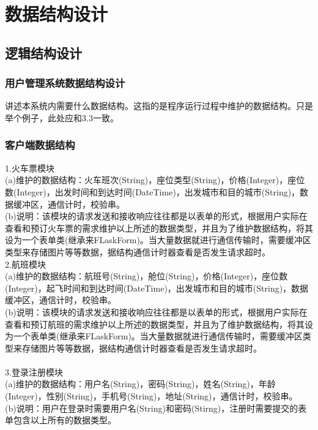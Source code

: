 \chapter{数据结构设计}
\section{逻辑结构设计}
\subsection{用户管理系统数据结构设计}
讲述本系统内需要什么数据结构。这指的是程序运行过程中维护的数据结构。只是举个例子，此处应和3.3一致。

\subsection{客户端数据结构}
\indent    1.火车票模块 \\
\indent    (a)维护的数据结构：火车班次(String)，座位类型(String)，价格(Integer)，座位数(Integer)，出发时间和到达时间(DateTime)，出发城市和目的城市(String)，数据缓冲区，通信计时，校验串。 \\
\indent    (b)说明：该模块的请求发送和接收响应往往都是以表单的形式，根据用户实际在查看和预订火车票的需求维护以上所述的数据类型，并且为了维护数据结构，将其设为一个表单类(继承来FLaskForm)。当大量数据就进行通信传输时，需要缓冲区类型来存储图片等等数据，据结构通信计时器查看是否发生请求超时。
\\

\indent    2.航班模块 \\
\indent    (a)维护的数据结构：航班号(String)，舱位(String)，价格(Integer)，座位数(Integer)，起飞时间和到达时间(DateTime)，出发城市和目的城市(String)，数据缓冲区，通信计时，校验串。\\
\indent    (b)说明：该模块的请求发送和接收响应往往都是以表单的形式，根据用户实际在查看和预订航班的需求维护以上所述的数据类型，并且为了维护数据结构，将其设为一个表单类(继承来FLaskForm)。当大量数据就进行通信传输时，需要缓冲区类型来存储图片等等数据，据结构通信计时器查看是否发生请求超时。
\\ \\

\indent    3.登录注册模块 \\
\indent    (a)维护的数据结构：用户名(String)，密码(String)，姓名(String)，年龄(Integer)，性别(String)，手机号(String)，地址(String)，通信计时，校验串。\\
\indent    (b)说明：用户在登录时需要用户名(String)和密码(Stirng)，注册时需要提交的表单包含以上所有的数据类型。 
\\

